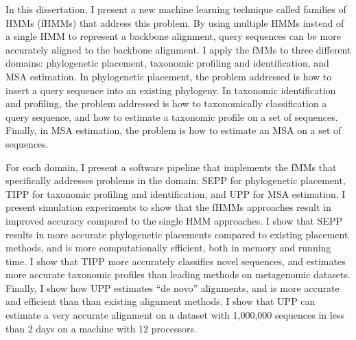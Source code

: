 \documentclass[12pt]{report}	%
\theoremstyle{definition}
\theoremstyle{remark}
\begin{document}
In this dissertation, I present a new machine learning technique called families of HMMs (fHMMs) that address this problem.  By using multiple HMMs instead of a single HMM to represent a backbone alignment, query sequences can be more accurately aligned to the backbone alignment.  I apply the fMMs to three different domains: phylogenetic placement, taxonomic profiling and identification, and MSA estimation.  In phylogenetic placement, the problem addressed is how to insert a query sequence into an existing phylogeny.  In taxonomic identification and profiling, the problem addressed is how to taxonomically classification a query sequence, and how to estimate a taxonomic profile on a set of sequences.  Finally, in MSA estimation, the problem is how to estimate an MSA on a set of sequences.

For each domain, I present a software pipeline that implements the fMMs that specifically addresses problems in the domain: SEPP for phylogenetic placement, TIPP for taxonomic profiling and identification, and UPP for MSA estimation.  I present simulation experiments to show that the fHMMs approaches result in improved accuracy compared to the single HMM approaches.  I show that SEPP results in more accurate phylogenetic placements compared to existing placement methods, and is more computationally efficient, both in memory and running time.  I show that TIPP more accurately classifies novel sequences, and estimates more accurate taxonomic profiles than leading methods on metagenomic datasets.  Finally, I show how UPP estimates ``de novo'' alignments, and is more accurate and efficient than than existing alignment methods.  I show that UPP can estimate a very accurate alignment on a dataset with 1,000,000 sequences in less than 2 days on a machine with 12 processors.

\tableofcontents   %

\listoftables      %
\listoffigures     %



%
%
% 
% 
% 
% 
% 
% 







\end{document}
